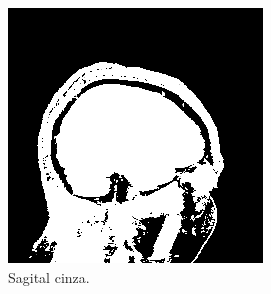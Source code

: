 \documentclass{article}
\begin{document}
\begin{figure}[h]
    \centering
    \begin{subfigure}[b]{0.3\textwidth}
        \includegraphics[width=\textwidth]{brain/_neuroradiologist-sagital-gray.png}
        \caption{Sagital cinza.}
    \end{subfigure}
    ~
    \begin{subfigure}[b]{0.3\textwidth}

\end{subfigure}
\end{figure}
\end{document}
